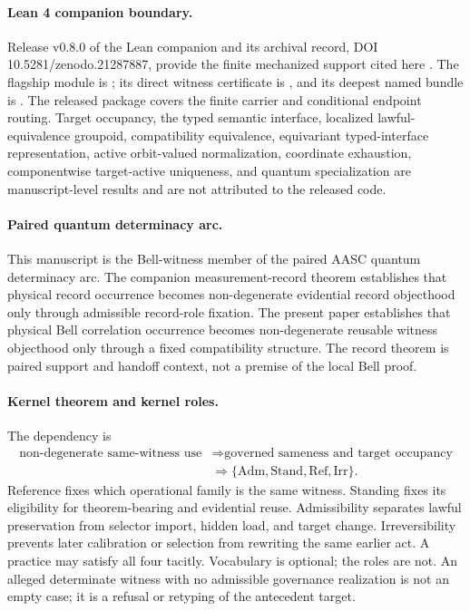 \documentclass[11pt]{article}
\theoremstyle{definition}
\newcommand{\Adm}{\mathrm{Adm}}
\newcommand{\Stand}{\mathrm{Stand}}
\newcommand{\RefRole}{\mathrm{Ref}}
\newcommand{\Irr}{\mathrm{Irr}}
\begin{document}
\paragraph{Lean 4 companion boundary.}
Release v0.8.0 of the Lean companion and its archival record, DOI 10.5281/zenodo.21287887, provide the finite mechanized support cited here \cite{MaleyEntanglementLean2026}. The flagship module is ; its direct witness certificate is , and its deepest named bundle is . The released package covers the finite carrier and conditional endpoint routing. Target occupancy, the typed semantic interface, localized lawful-equivalence groupoid, compatibility equivalence, equivariant typed-interface representation, active orbit-valued normalization, coordinate exhaustion, componentwise target-active uniqueness, and quantum specialization are manuscript-level results and are not attributed to the released code.

\paragraph{Paired quantum determinacy arc.}
This manuscript is the Bell-witness member of the paired AASC quantum determinacy arc. The companion measurement-record theorem establishes that physical record occurrence becomes non-degenerate evidential record objecthood only through admissible record-role fixation. The present paper establishes that physical Bell correlation occurrence becomes non-degenerate reusable witness objecthood only through a fixed compatibility structure. The record theorem is paired support and handoff context, not a premise of the local Bell proof.

\paragraph{Kernel theorem and kernel roles.}
The dependency is
\[
\begin{aligned}
\text{non-degenerate same-witness use}
&\Longrightarrow \text{governed sameness and target occupancy}\\
&\Longrightarrow \{\Adm,\Stand,\RefRole,\Irr\}.
\end{aligned}
\]
Reference fixes which operational family is the same witness. Standing fixes its eligibility for theorem-bearing and evidential reuse. Admissibility separates lawful preservation from selector import, hidden load, and target change. Irreversibility prevents later calibration or selection from rewriting the same earlier act. A practice may satisfy all four tacitly. Vocabulary is optional; the roles are not. An alleged determinate witness with no admissible governance realization is not an empty case; it is a refusal or retyping of the antecedent target.
\end{document}
